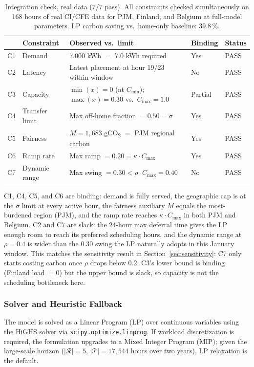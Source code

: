 \documentclass[11pt, a4paper]{article}
\begin{document}
\begin{table}[h]
\centering\small
\renewcommand{\arraystretch}{1.3}
\begin{tabularx}{\linewidth}{p{0.6cm}p{2.4cm}Xp{1.4cm}p{1.2cm}}
\toprule
 & \textbf{Constraint} & \textbf{Observed vs.\ limit} & \textbf{Binding} & \textbf{Status} \\
\midrule
C1 & Demand           & 7.000 kWh $=$ 7.0 kWh required & Yes & PASS \\
C2 & Latency          & Latest placement at hour 19/23 within window & No  & PASS \\
C3 & Capacity         & $\min(x)=0$ (at $C_{\min}$); $\max(x)=0.30$ vs.\ $C_{\max}=1.0$ & Partial & PASS \\
C4 & Transfer limit   & Max off-home fraction $= 0.50 = \sigma$ & Yes & PASS \\
C5 & Fairness         & $M = 1{,}683$ gCO\textsubscript{2} $=$ PJM regional carbon & Yes & PASS \\
C6 & Ramp rate        & Max ramp $= 0.20 = \kappa \cdot C_{\max}$ & Yes & PASS \\
C7 & Dynamic range    & Max swing $= 0.30 < \rho \cdot C_{\max} = 0.40$ & No  & PASS \\
\bottomrule
\end{tabularx}
\caption{Integration check, real data (7/7 pass). All constraints checked simultaneously on 168 hours of real CI/CFE data for PJM, Finland, and Belgium at full-model parameters. LP carbon saving vs.\ home-only baseline: 39.8\,\%.\label{tab:validation}}
\end{table}

C1, C4, C5, and C6 are binding: demand is fully served, the geographic cap is at the $\sigma$ limit at every active hour, the fairness auxiliary $M$ equals the most-burdened region (PJM), and the ramp rate reaches $\kappa \cdot C_{\max}$ in both PJM and Belgium. C2 and C7 are slack: the 24-hour max deferral time gives the LP enough room to reach its preferred scheduling hours, and the dynamic range at $\rho=0.4$ is wider than the 0.30 swing the LP naturally adopts in this January window. This matches the sensitivity result in Section~\ref{sec:sensitivity}: C7 only starts costing carbon once $\rho$ drops below 0.2. C3's lower bound is binding (Finland load $= 0$) but the upper bound is slack, so capacity is not the scheduling bottleneck here.

\subsubsection{Solver and Heuristic Fallback}
The model is solved as a Linear Program (LP) over continuous variables using the HiGHS solver via \texttt{scipy.optimize.linprog}. If workload discretization is required, the formulation upgrades to a Mixed Integer Program (MIP); given the large-scale horizon (\(|\mathcal{R}|=5\), \(|\mathcal{T}| = 17{,}544\) hours over two years), LP relaxation is the default.
\end{document}
